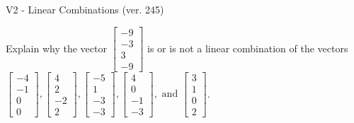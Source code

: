 \begin{exercise}
  \begin{exerciseTitle}V2 - Linear Combinations (ver. 245)\end{exerciseTitle}
  \begin{exerciseStatement}
    Explain why the vector \(\left[\begin{array}{c}
-9 \\
-3 \\
3 \\
-9
\end{array}\right]\)  is or is not a linear 
	combination of the vectors \(\left[\begin{array}{c}
-4 \\
-1 \\
0 \\
0
\end{array}\right] , \left[\begin{array}{c}
4 \\
2 \\
-2 \\
2
\end{array}\right] , \left[\begin{array}{c}
-5 \\
1 \\
-3 \\
-3
\end{array}\right] , \left[\begin{array}{c}
4 \\
0 \\
-1 \\
-3
\end{array}\right] , \text{ and } \left[\begin{array}{c}
3 \\
1 \\
0 \\
2
\end{array}\right]\).
	



\end{exerciseStatement}
\end{exercise}
